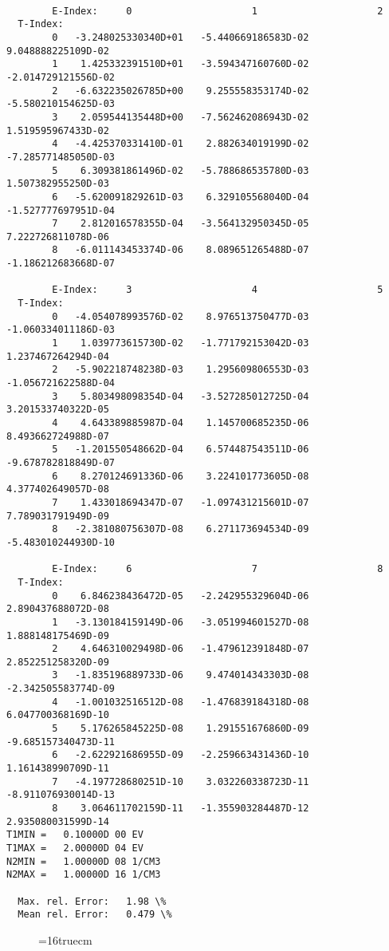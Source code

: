 \documentclass[12pt,dvipdfmx]{article}
\begin{document}
\begin{small}\begin{verbatim}

        E-Index:     0                     1                     2
  T-Index:
        0   -3.248025330340D+01   -5.440669186583D-02    9.048888225109D-02
        1    1.425332391510D+01   -3.594347160760D-02   -2.014729121556D-02
        2   -6.632235026785D+00    9.255558353174D-02   -5.580210154625D-03
        3    2.059544135448D+00   -7.562462086943D-02    1.519595967433D-02
        4   -4.425370331410D-01    2.882634019199D-02   -7.285771485050D-03
        5    6.309381861496D-02   -5.788686535780D-03    1.507382955250D-03
        6   -5.620091829261D-03    6.329105568040D-04   -1.527777697951D-04
        7    2.812016578355D-04   -3.564132950345D-05    7.222726811078D-06
        8   -6.011143453374D-06    8.089651265488D-07   -1.186212683668D-07

        E-Index:     3                     4                     5
  T-Index:
        0   -4.054078993576D-02    8.976513750477D-03   -1.060334011186D-03
        1    1.039773615730D-02   -1.771792153042D-03    1.237467264294D-04
        2   -5.902218748238D-03    1.295609806553D-03   -1.056721622588D-04
        3    5.803498098354D-04   -3.527285012725D-04    3.201533740322D-05
        4    4.643389885987D-04    1.145700685235D-06    8.493662724988D-07
        5   -1.201550548662D-04    6.574487543511D-06   -9.678782818849D-07
        6    8.270124691336D-06    3.224101773605D-08    4.377402649057D-08
        7    1.433018694347D-07   -1.097431215601D-07    7.789031791949D-09
        8   -2.381080756307D-08    6.271173694534D-09   -5.483010244930D-10

        E-Index:     6                     7                     8
  T-Index:
        0    6.846238436472D-05   -2.242955329604D-06    2.890437688072D-08
        1   -3.130184159149D-06   -3.051994601527D-08    1.888148175469D-09
        2    4.646310029498D-06   -1.479612391848D-07    2.852251258320D-09
        3   -1.835196889733D-06    9.474014343303D-08   -2.342505583774D-09
        4   -1.001032516512D-08   -1.476839184318D-08    6.047700368169D-10
        5    5.176265845225D-08    1.291551676860D-09   -9.685157340473D-11
        6   -2.622921686955D-09   -2.259663431436D-10    1.161438990709D-11
        7   -4.197728680251D-10    3.032260338723D-11   -8.911076930014D-13
        8    3.064611702159D-11   -1.355903284487D-12    2.935080031599D-14
T1MIN =   0.10000D 00 EV
T1MAX =   2.00000D 04 EV
N2MIN =   1.00000D 08 1/CM3
N2MAX =   1.00000D 16 1/CM3

  Max. rel. Error:   1.98 \%
  Mean rel. Error:   0.479 \%

\end{verbatim}\end{small}
\begin{figure} \label{H4-2.1.5FU}
\epsfxsize=16truecm
\end{figure}
\newpage
\end{document}
